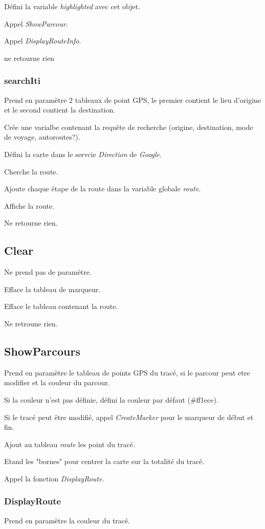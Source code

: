 \documentclass[a4paper]{article}
\begin{document}
Défini la variable \emph{highlighted} avec cet objet.

Appel \emph{ShowParcour}.

Appel \emph{DisplayRouteInfo}.

ne retourne rien 

\subsubsection{searchIti}
Prend en paramètre 2 tableaux de point GPS, le premier contient le lieu d'origine et le second contient la destination.

Crée une varialbe contenant la requête de recherche (origine, destination, mode de voyage, autoroutes?).

Défini la carte dans le servcie \emph{Direction} de \emph{Google}.

Cherche la route.

Ajoute chaque étape de la route dans la variable globale \emph{route}.

Affiche la route.

Ne retourne rien.

\subsection{Clear}
Ne prend pas de paramètre.

Efface la tableau de marqueur.

Efface le tableau contenant la route.

Ne retroune rien.

\subsection{ShowParcours}
Prend en paramètre le tableau de points GPS du tracé, si le parcour peut etre modifier et la couleur du parcour.

Si la couleur n'est pas définie, défini la couleur par défaut (\#ff1ece).

Si le tracé peut être modifié, appel \emph{CreateMarker} pour le marqueur de début et fin.

Ajout au tableau \emph{route} les point du tracé.

Etand les "bornes" pour centrer la carte sur la totalité du tracé.

Appel la fonction \emph{DisplayRoute}.

\subsubsection{DisplayRoute}
Prend en paramètre la couleur du tracé.
\end{document}
